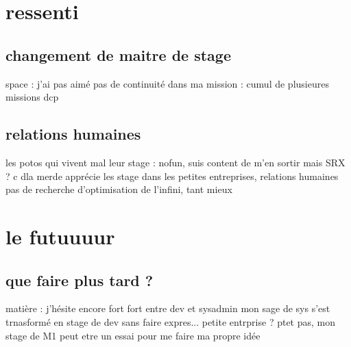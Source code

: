 \section{ressenti}
\subsection{changement de maitre de stage}
space : j'ai pas aimé
pas de continuité dans ma mission : cumul de plusieures missions dcp
\subsection{relations humaines}
les potos qui vivent mal leur stage : nofun, suis content de m'en sortir mais SRX ? c dla merde
apprécie les stage dans les petites entreprises, relations humaines
pas de recherche d'optimisation de l'infini, tant mieux
\section{le futuuuur}
\subsection{que faire plus tard ?}
matière : j'hésite encore fort fort entre dev et sysadmin
mon sage de sys s'est trnasformé en stage de dev sans faire expres...
petite entrprise ? ptet pas, mon stage de M1 peut etre un essai pour me faire ma propre idée
